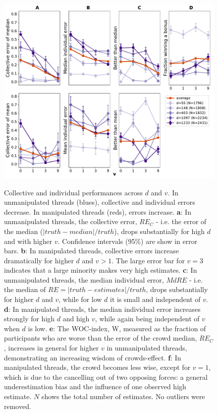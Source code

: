 \documentclass[10pt,a4paper,twocolumn,lineno]{article}
\begin{document}
\begin{figure}
\caption[Collective and individual performances]{\small
Collective and individual performances across $d$ and $v$. In unmanipulated threads (blues), collective and individual errors decrease. In manipulated threads (reds), errors increase. \textbf{a}: In unmanipulated threads, the collective error, $RE_C$ - i.e. the error of the median ($|truth-median|/truth$), drops substantially for high $d$ and with higher $v$. Confidence intervals (95\%) are show in error bars. \textbf{b}: In manipulated threads, collective errors increase dramatically for higher $d$ and $v>1$. The large error bar for $v=3$ indicates that a large minority makes very high estimates. \textbf{c}: In unmanipulated threads, the median individual error, $MdRE$ - i.e. the median of $RE = |truth-estimates|/truth$, drops substantially for higher $d$ and $v$, while for low $d$ it is small and independent of $v$. \textbf{d}: In manipulated threads, the median individual error increases strongly for high $d$ and high $v$, while again being independent of $v$ when $d$ is low. \textbf{e}: The WOC-index, W, measured as the fraction of participants who are worse than the error of the crowd median, $RE_C$, increases in general for higher $v$ in unmanipulated threads, demonstrating an increasing wisdom of crowds-effect. \textbf{f}: In manipulated threads, the crowd becomes less wise, except for $v=1$, which is due to the cancelling out of two opposing forces: a general underestimation bias and the influence of one observed high estimate.  $N$ shows the total number of estimates. No outliers were removed.
}
\includegraphics[width=.5\textwidth]{../plots/fig2.pdf}
\label{fig:2}
\end{figure}
\end{document}
